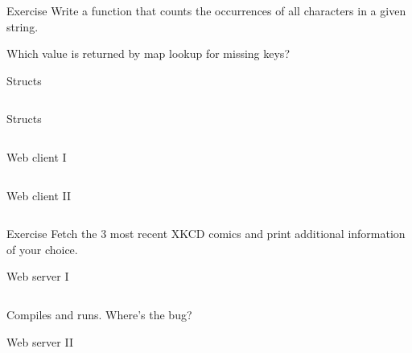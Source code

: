 \documentclass[10pt]{beamer}
\begin{document}
	\begin{frame}[fragile]{Exercise}
		Write a function that counts the occurrences of all characters in a given string.
	
		Which value is returned by map lookup for missing keys?
	\end{frame}
	
	
	\begin{frame}[t,fragile]{Structs}
		\inputminted{go}{code/08_structs.go}
	\end{frame}
		
	
	\begin{frame}[t,fragile]{Structs}
		\inputminted{go}{code/09_structs.go}
	\end{frame}
			
	
	\begin{frame}[t,fragile]{Web client I}
		\inputminted[fontsize=\footnotesize]{go}{code/10_xkcd.go}
	\end{frame}
				
	
	\begin{frame}[t,fragile]{Web client II}
		\inputminted{go}{code/10b_xkcd.go}
	\end{frame}
	
	
	\begin{frame}[fragile]{Exercise}
		Fetch the 3 most recent XKCD comics and print additional information of your choice.
	\end{frame}
					
	
	\begin{frame}[t,fragile]{Web server I}
		\inputminted{go}{code/11_server.go}
		\pause
		Compiles and runs. Where's the bug?
	\end{frame}
					
	
	\begin{frame}[t,fragile]{Web server II}
		\inputminted{go}{code/12_mutex.go}
	\end{frame}
						
\end{document}
